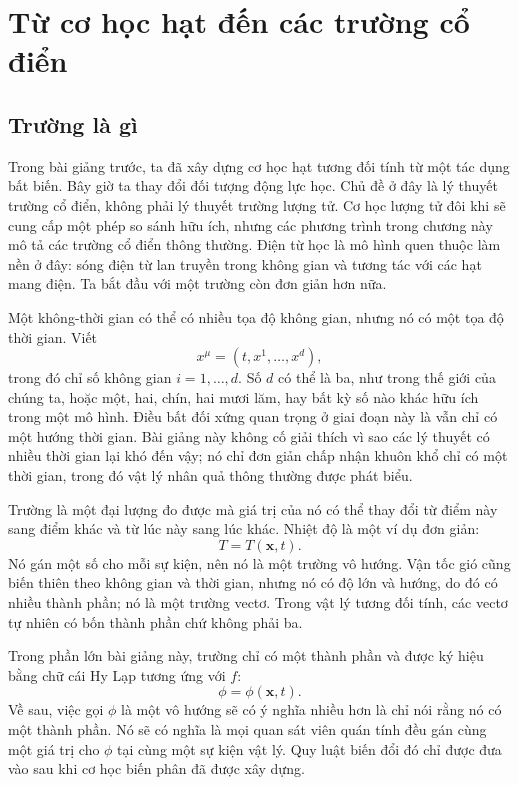 \chapter{Từ cơ học hạt đến các trường cổ điển}

\section{Trường là gì}

Trong bài giảng trước, ta đã xây dựng cơ học hạt tương đối tính từ một tác dụng bất biến. Bây giờ ta thay đổi đối tượng động lực học. Chủ đề ở đây là lý thuyết trường cổ điển, không phải lý thuyết trường lượng tử. Cơ học lượng tử đôi khi sẽ cung cấp một phép so sánh hữu ích, nhưng các phương trình trong chương này mô tả các trường cổ điển thông thường. Điện từ học là mô hình quen thuộc làm nền ở đây: sóng điện từ lan truyền trong không gian và tương tác với các hạt mang điện. Ta bắt đầu với một trường còn đơn giản hơn nữa.

Một không-thời gian có thể có nhiều tọa độ không gian, nhưng nó có một tọa độ thời gian. Viết
\begin{equation}
x^\mu=(t,x^1,\ldots,x^d),
\end{equation}
trong đó chỉ số không gian \(i=1,\ldots,d\). Số \(d\) có thể là ba, như trong thế giới của chúng ta, hoặc một, hai, chín, hai mươi lăm, hay bất kỳ số nào khác hữu ích trong một mô hình. Điều bất đối xứng quan trọng ở giai đoạn này là vẫn chỉ có một hướng thời gian. Bài giảng này không cố giải thích vì sao các lý thuyết có nhiều thời gian lại khó đến vậy; nó chỉ đơn giản chấp nhận khuôn khổ chỉ có một thời gian, trong đó vật lý nhân quả thông thường được phát biểu.

Trường là một đại lượng đo được mà giá trị của nó có thể thay đổi từ điểm này sang điểm khác và từ lúc này sang lúc khác. Nhiệt độ là một ví dụ đơn giản:
\begin{equation}
T=T(\mathbf{x},t).
\end{equation}
Nó gán một số cho mỗi sự kiện, nên nó là một trường vô hướng. Vận tốc gió cũng biến thiên theo không gian và thời gian, nhưng nó có độ lớn và hướng, do đó có nhiều thành phần; nó là một trường vectơ. Trong vật lý tương đối tính, các vectơ tự nhiên có bốn thành phần chứ không phải ba.

Trong phần lớn bài giảng này, trường chỉ có một thành phần và được ký hiệu bằng chữ cái Hy Lạp tương ứng với \(f\):
\begin{equation}
\phi=\phi(\mathbf{x},t).
\label{eq:sr4-field-definition}
\end{equation}
Về sau, việc gọi \(\phi\) là một vô hướng sẽ có ý nghĩa nhiều hơn là chỉ nói rằng nó có một thành phần. Nó sẽ có nghĩa là mọi quan sát viên quán tính đều gán cùng một giá trị cho \(\phi\) tại cùng một sự kiện vật lý. Quy luật biến đổi đó chỉ được đưa vào sau khi cơ học biến phân đã được xây dựng.

